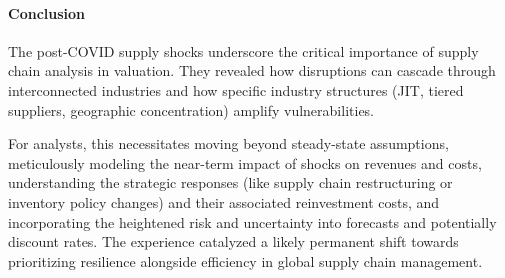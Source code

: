 \paragraph{Conclusion}
The post-COVID supply shocks underscore the critical importance of supply chain analysis in valuation. They revealed how disruptions can cascade through interconnected industries and how specific industry structures (JIT, tiered suppliers, geographic concentration) amplify vulnerabilities. 

For analysts, this necessitates moving beyond steady-state assumptions, meticulously modeling the near-term impact of shocks on revenues and costs, understanding the strategic responses (like supply chain restructuring or inventory policy changes) and their associated reinvestment costs, and incorporating the heightened risk and uncertainty into forecasts and potentially discount rates. The experience catalyzed a likely permanent shift towards prioritizing resilience alongside efficiency in global supply chain management.

